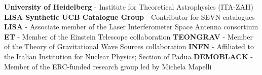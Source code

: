 %
%
%


\begin{singlelines}
					{\textbf{University of Heidelberg} - Institute for Theoretical Astrophysics (ITA-ZAH)}{}
					{\textbf{LISA Synthetic UCB Catalogue Group} - Contributor for SEVN catalogues}{}
					{\textbf{LISA} - Associate member of the Laser Interferometer Space Antenna consortium}	{}
					{\textbf{ET} - Member of the Einstein Telescope collaboration}{}
					{\textbf{TEONGRAV} - Member of the Theory of Gravitational Wave Sources collaboration}{}
					{\textbf{INFN}	- Affiliated to the Italian Institution for Nuclear Physics; Section of Padua}{}
					{\textbf{DEMOBLACK} - Member of the ERC-funded research group led by Michela Mapelli }{}
\end{singlelines}